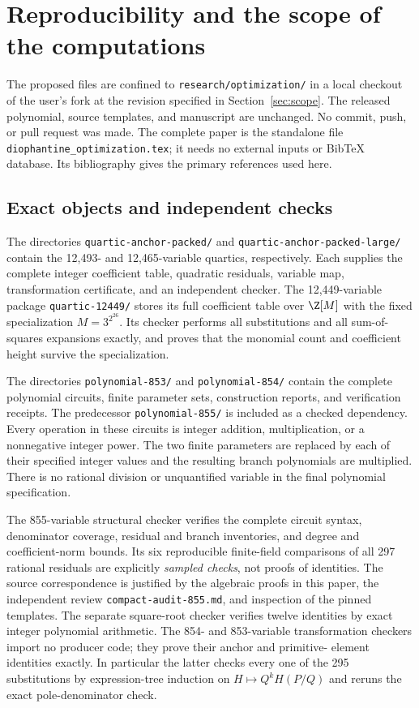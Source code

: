 \section{Reproducibility and the scope of the computations}
\label{sec:reproducibility}

The proposed files are confined to \nolinkurl{research/optimization/}
in a local checkout of the user's fork at the revision specified in
Section~\ref{sec:scope}. The released polynomial, source templates, and
manuscript are unchanged. No commit, push, or pull request was made.
The complete paper is the standalone file
\nolinkurl{diophantine_optimization.tex}; it needs no external inputs or
BibTeX database. Its bibliography gives the primary references used here.

\subsection{Exact objects and independent checks}

The directories \nolinkurl{quartic-anchor-packed/} and
\nolinkurl{quartic-anchor-packed-large/} contain the 12,493- and
12,465-variable quartics, respectively. Each supplies the complete
integer coefficient table, quadratic residuals, variable map,
transformation certificate, and an independent checker. The
12,449-variable package \nolinkurl{quartic-12449/} stores its full
coefficient table over $\Z[M]$ with the fixed specialization
$M=3^{2^{26}}$. Its checker performs all substitutions and all
sum-of-squares expansions exactly, and proves that the monomial count
and coefficient height survive the specialization.

The directories \nolinkurl{polynomial-853/} and
\nolinkurl{polynomial-854/} contain the complete polynomial circuits,
finite parameter sets, construction reports, and verification receipts.
The predecessor \nolinkurl{polynomial-855/} is included as a checked
dependency. Every operation in these circuits is integer addition,
multiplication, or a nonnegative integer power. The two finite parameters
are replaced by each of their specified integer values and the resulting
branch polynomials are multiplied. There is no rational division or
unquantified variable in the final polynomial specification.

The 855-variable structural checker verifies the complete circuit
syntax, denominator coverage, residual and branch inventories, and
degree and coefficient-norm bounds. Its six reproducible finite-field
comparisons of all 297 rational residuals are explicitly \emph{sampled
checks}, not proofs of identities. The source correspondence is justified
by the algebraic proofs in this paper, the independent review
\nolinkurl{compact-audit-855.md}, and inspection of the pinned templates.
The separate square-root checker verifies twelve identities by exact
integer polynomial arithmetic. The 854- and 853-variable transformation
checkers import no producer code; they prove their anchor and primitive-
element identities exactly. In particular the latter checks every one
of the 295 substitutions by expression-tree induction on
$H\mapsto Q^kH(P/Q)$ and reruns the exact pole-denominator check.

